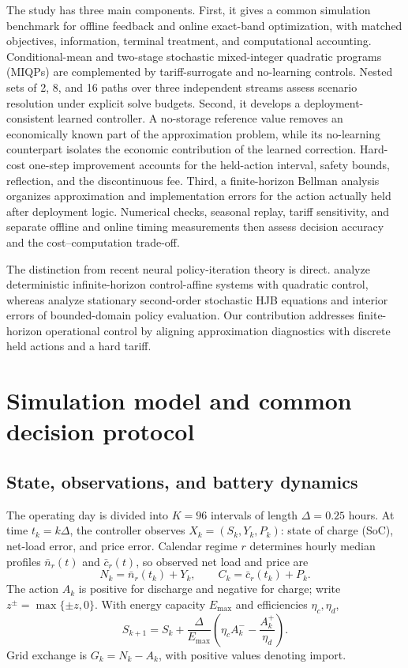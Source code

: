 \documentclass[preprint,11pt]{elsarticle}
\theoremstyle{plain}
\theoremstyle{remark}
\begin{document}
The study has three main components.
First, it gives a common simulation benchmark for offline feedback and online exact-band
optimization, with matched objectives, information, terminal treatment, and
computational accounting. Conditional-mean and two-stage stochastic
mixed-integer quadratic programs (MIQPs) are complemented by tariff-surrogate
and no-learning controls. Nested sets of 2, 8, and 16 paths over three
independent streams assess scenario resolution under explicit solve budgets.
Second, it develops a deployment-consistent learned
controller. A no-storage reference value removes an economically known part of
the approximation problem, while its no-learning counterpart isolates the
economic contribution of the learned correction. Hard-cost one-step
improvement accounts for the held-action interval, safety bounds, reflection,
and the discontinuous fee.
Third, a finite-horizon Bellman analysis organizes approximation and
implementation errors for the action actually held after deployment logic.
Numerical checks, seasonal replay, tariff sensitivity, and separate offline
and online timing measurements then assess decision accuracy and the
cost--computation trade-off.

The distinction from recent neural policy-iteration theory is direct.
\citet{Meng2024} analyze deterministic infinite-horizon control-affine systems
with quadratic control, whereas \citet{Kim2025} analyze stationary second-order
stochastic HJB equations and interior errors of bounded-domain policy
evaluation. Our contribution addresses finite-horizon operational control by
aligning approximation diagnostics with discrete held actions and a hard tariff.

\section{Simulation model and common decision protocol}\label{sec:benchmark}

\subsection{State, observations, and battery dynamics}

The operating day is divided into $K=96$ intervals of length
$\Delta=0.25$ hours. At time $t_k=k\Delta$, the controller observes
$X_k=(S_k,Y_k,P_k)$: state of charge (SoC), net-load error, and price error.
Calendar regime $r$ determines hourly median profiles $\bar n_r(t)$ and
$\bar c_r(t)$, so observed net load and price are
\begin{equation}
 N_k=\bar n_r(t_k)+Y_k, \qquad C_k=\bar c_r(t_k)+P_k.
\end{equation}
The action $A_k$ is positive for discharge and negative for charge; write
$z^{\pm}=\max\{\pm z,0\}$. With
energy capacity $E_{\max}$ and efficiencies $\eta_c,\eta_d$,
\begin{equation}
 S_{k+1}=S_k+\frac{\Delta}{E_{\max}}
 \left(\eta_c A_k^- - \frac{A_k^+}{\eta_d}\right).
 \label{eq:soc-transition}
\end{equation}
Grid exchange is $G_k=N_k-A_k$, with positive values denoting import.
\end{document}
